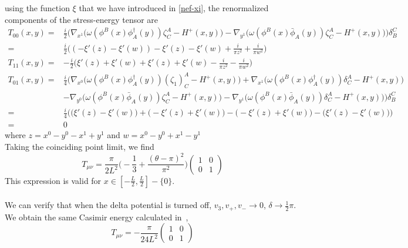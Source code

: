 using the function $\xi$ that we have introduced in \cref{nef-xi}, 
the renormalized components of the stress-energy tensor are
\begin{equation}\label{vacuum-stressenergy}
\begin{split}
T_{00}(x,y) = 
& \frac{i}{2}\Big(\nabla_{x^1} \big( \omega(\phi^B(x) \phi^\dagger_A(y))\zeta^A_C - H^+(x,y) \big)
- \nabla_{y^1} \big( \omega( \phi^B(x) \bar{\phi}_A(y))\zeta^A_C - H^+(x,y) \big)
\Big)\delta_B^C  \\
= & \frac{i}{2} \big( (-\xi'(z) - \xi'(w)) - \xi'(z) - \xi'(w) + \frac{i}{\pi z^2} + \frac{i}{\pi w^2} \big)   \\
T_{11}(x,y) =
& - \frac{i}{2}\big( \xi'(z) + \xi'(w) + \xi'(z) + \xi'(w) - \frac{i}{\pi z^2} - \frac{i}{\pi w^2}\big) \\
T_{01}(x,y) = 
& \frac{i}{4}\Big(\nabla_{x^0} \big( \omega(\phi^B(x) \phi^\dagger_A(y))(\zeta_1)^A_C - H^+(x,y) \big) + \nabla_{x^1} \big( \omega(\phi^B(x) \phi^\dagger_A(y))\delta^A_C - H^+(x,y) \big)  \\
& - \nabla_{y^0} \big( \omega( \phi^B(x) \bar{\phi}_A(y))\zeta^A_C - H^+(x,y) \big)
- \nabla_{y^1} \big( \omega( \phi^B(x) \bar{\phi}_A(y))\delta^A_C - H^+(x,y) \big)
\Big)\delta_B^C \\
= & \frac{i}{4}\Big( \big( \xi'(z) - \xi'(w) \big) + \big(- \xi'(z) + \xi'(w) \big) - \big( - \xi'(z) + \xi'(w) \big) - \big( \xi'(z) - \xi'(w) \big) \Big) \\
= & 0
\end{split}
\end{equation}
where $z = x^0 - y^0 - x^1 + y^1$ and $w = x^0 - y^0 + x^1 - y^1$ \\
Taking the coinciding point limit, we find
\begin{equation*}
T_{\mu\nu} = \frac{ \pi}{2 L^2} \big( -\frac{1}{3} + \frac{(\theta - \pi)^2}{\pi^2}\big)\begin{pmatrix}
1  & 0 \\ 0  &  1
\end{pmatrix}
\end{equation*}
This expression is valid for $x\in[-\frac L 2 , \frac L 2] - \{0\}$.\\\\
%
We can verify that when the delta potential is turned off, \ie $v_3, v_+, v_- \rightarrow 0$, $\delta \rightarrow \frac 1 2 \pi$.
We obtain the same Casimir energy calculated in~\cite{Sundberg2003}, \ie
\begin{equation*}
T_{\mu\nu} = -\frac{\pi}{24L^2}\begin{pmatrix} 1 & 0 \\ 0 & 1\end{pmatrix}
\end{equation*}













